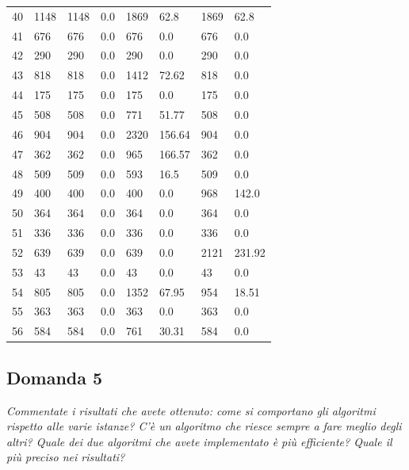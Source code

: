 \begin{longtable}{llllllll}
	40 & 1148 & 1148 & 0.0 & 1869 & 62.8 & 1869 & 62.8 \\
	41 & 676 & 676 & 0.0 & 676 & 0.0 & 676 & 0.0 \\
	42 & 290 & 290 & 0.0 & 290 & 0.0 & 290 & 0.0 \\
	43 & 818 & 818 & 0.0 & 1412 & 72.62 & 818 & 0.0 \\
	44 & 175 & 175 & 0.0 & 175 & 0.0 & 175 & 0.0 \\
	45 & 508 & 508 & 0.0 & 771 & 51.77 & 508 & 0.0 \\
	46 & 904 & 904 & 0.0 & 2320 & 156.64 & 904 & 0.0 \\
	47 & 362 & 362 & 0.0 & 965 & 166.57 & 362 & 0.0 \\
	48 & 509 & 509 & 0.0 & 593 & 16.5 & 509 & 0.0 \\
	49 & 400 & 400 & 0.0 & 400 & 0.0 & 968 & 142.0 \\
	50 & 364 & 364 & 0.0 & 364 & 0.0 & 364 & 0.0 \\
	51 & 336 & 336 & 0.0 & 336 & 0.0 & 336 & 0.0 \\
	52 & 639 & 639 & 0.0 & 639 & 0.0 & 2121 & 231.92 \\
	53 & 43 & 43 & 0.0 & 43 & 0.0 & 43 & 0.0 \\
	54 & 805 & 805 & 0.0 & 1352 & 67.95 & 954 & 18.51 \\
	55 & 363 & 363 & 0.0 & 363 & 0.0 & 363 & 0.0 \\
	56 & 584 & 584 & 0.0 & 761 & 30.31 & 584 & 0.0
	\end{longtable}

\subsection{Domanda 5}
\textit{Commentate i risultati che avete ottenuto: come si comportano gli algoritmi rispetto alle varie istanze? C'è un algoritmo che riesce sempre a fare meglio degli altri? Quale dei due algoritmi che avete implementato è più efficiente? Quale il più preciso nei risultati?}

